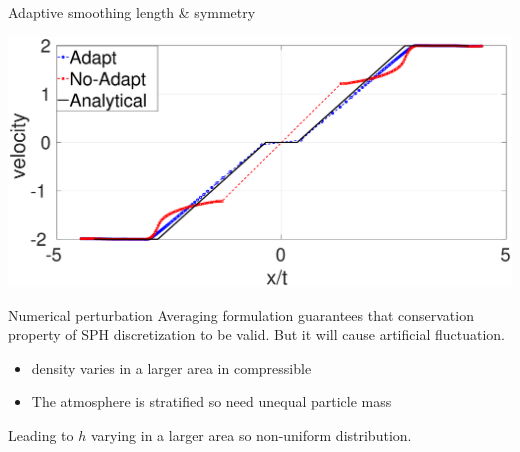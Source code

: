 \documentclass{beamer}
\begin{document}
\begin{frame}{Adaptive smoothing length \& symmetry}
\begin{minipage}{.43\textwidth}
\end{minipage}%
\begin{minipage}{.43 \textwidth}
        \centering
        \includegraphics[width=0.88 \textwidth]{./Chapter-3/Figures/Sjogreen-adptVSno-v}
\end{minipage}%
\end{frame}

\begin{frame}{Numerical perturbation}
Averaging formulation guarantees that conservation property of SPH discretization to be valid. But it will cause artificial fluctuation. \\
\begin{minipage}{.480\linewidth} 
\end{minipage}
\hfill
\begin{minipage}{.480\linewidth} 
\end{minipage}
%  
\begin{itemize}
\item density varies in a larger area in compressible
\item The atmosphere is stratified so need unequal particle mass
\end{itemize}
Leading to $h$ varying in a larger area so non-uniform distribution.
\end{frame}
\end{document}
